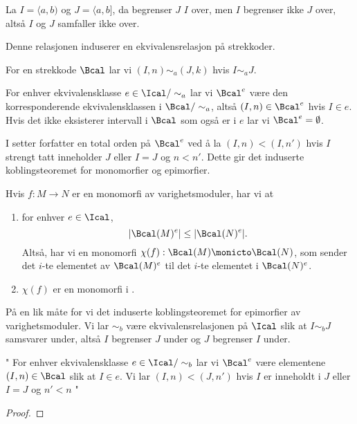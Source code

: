 \begin{bemerk}
  La $I = \langle a,b)$ og $J = \langle a,b]$, da
  begrenser $J$ $I$ over, men $I$ begrenser ikke $J$ over,
  altså $I$ og $J$ samfaller ikke over.
\end{bemerk}

Denne relasjonen induserer en ekvivalensrelasjon på
strekkoder.

\begin{definisjon}\label{def:EkRelBarc}
  For en strekkode $\Bcal$ lar vi $(I,n)\sim_a (J,k)$ hvis
  $I\sim_a J$.
\end{definisjon}

For enhver ekvivalensklasse $e\in\Ical/\sim_a$ lar vi
$\Bcal^e$ være den korresponderende ekvivalensklassen
i $\Bcal/\sim_a$, altså $(I,n)\in\Bcal^e$ hvis $I\in e$.
Hvis det ikke eksisterer intervall i $\Bcal$ som også er
i $e$ lar vi $\Bcal^e=\emptyset$.

I \citep[seksjon 3.2]{Bauer2020} setter forfatter en total orden
på $\Bcal^e$ ved å la $(I,n) < (I,n')$ hvis $I$ strengt tatt
inneholder $J$ eller $I=J$ og $n<n'$. Dette gir det induserte
koblingsteoremet for monomorfier og epimorfier.

\begin{proposisjon}
Hvis $f:M\to N$ er en monomorfi av varighetsmoduler, har vi at
\begin{enumerate}
  \item for enhver $e\in\Ical$,
    \[|\Bcal(M)^e|\leq|\Bcal(N)^e|.\]
    Altså, har vi en monomorfi $\chi(f):\Bcal(M)\monicto\Bcal(N)$,
    som sender det $i$-te elementet av $\Bcal(M)^e$ til det $i$-te
    elementet i $\Bcal(N)^e$.
  \item $\chi(f)$ er en monomorfi i \Barc.
\end{enumerate}
\end{proposisjon}

På en lik måte for vi det induserte koblingsteoremet for
epimorfier av varighetsmoduler. Vi lar $\sim_b$ være
ekvivalensrelasjonen på $\Ical$ slik at $I\sim_b J$
samsvarer under, altså $I$ begrenser $J$ under og $J$
begrenser $I$ under. 


"
For enhver ekvivalensklasse
$e\in\Ical/\sim_b$ lar vi $\Bcal^e$ være elementene
$(I,n)\in\Bcal$ slik at $I\in e$. Vi lar $(I,n)<(J,n')$
hvis $I$ er inneholdt i $J$ eller $I=J$ og $n'<n$
"


\begin{proposisjon}\label{prop:IKTepi}
  
\end{proposisjon}
\begin{proof}

\end{proof}
